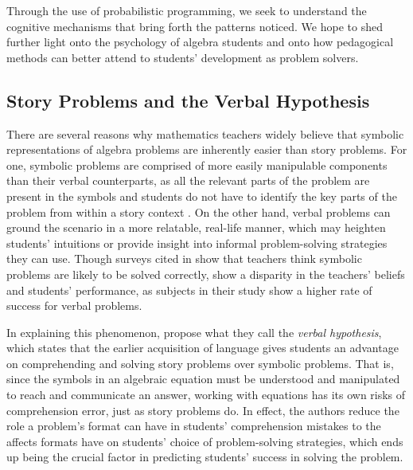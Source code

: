 \documentclass[10pt,letterpaper]{article}
\begin{document}
Through the use of probabilistic programming, we seek to understand the cognitive mechanisms that bring forth the patterns  noticed. We hope to shed further light onto the psychology of algebra students and onto how pedagogical methods can better attend to students' development as problem solvers.


\subsection{Story Problems and the Verbal Hypothesis}

There are several reasons why mathematics teachers widely believe that symbolic representations of algebra problems are inherently easier than story problems. For one, symbolic problems are comprised of more easily manipulable components than their verbal counterparts, as all the relevant parts of the problem are present in the symbols and students do not have to identify the key parts of the problem from within a story context \cite{KoedNath2004}. On the other hand, verbal problems can ground the scenario in a more relatable, real-life manner, which may heighten students’ intuitions or provide insight into informal problem-solving strategies they can use. Though surveys cited in \cite{Nathan2012} show that teachers think symbolic problems are likely to be solved correctly,  show a disparity in the teachers' beliefs and students' performance, as subjects in their study show a higher rate of success for verbal problems.

In explaining this phenomenon,  propose what they call the \textit{verbal hypothesis}, which states that the earlier acquisition of language gives students an advantage on comprehending and solving story problems over symbolic problems. That is, since the symbols in an algebraic equation must be understood and manipulated to reach and communicate an answer, working with equations has its own risks of comprehension error, just as story problems do. In effect, the authors reduce the role a problem's format can have in students' comprehension mistakes to the affects formats have on students' choice of problem-solving strategies, which ends up being the crucial factor in predicting students' success in solving the problem.
\end{document}
